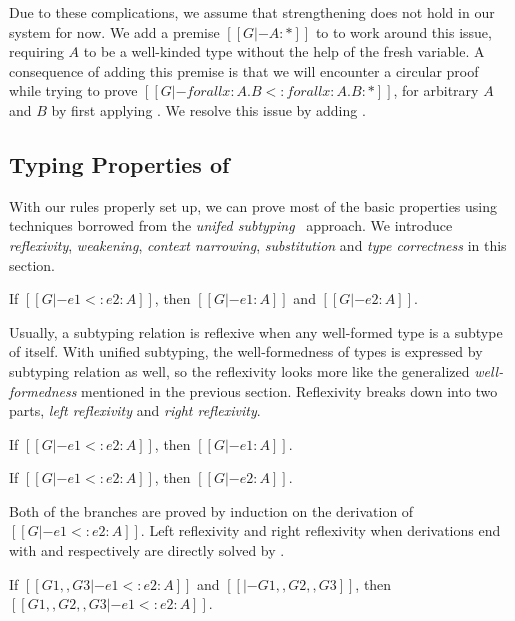 Due to these complications, we assume that strengthening does not hold in our system for now.
We add a premise $[[G |- A : *]]$ to  to work around this issue,
requiring $A$ to be a well-kinded type without the help of the fresh variable.
A consequence of adding this premise is that we will encounter a circular proof
while trying to prove $[[G |- forall x : A. B <: forall x : A . B : *]]$, for
arbitrary $A$ and $B$ by first applying . We resolve this issue by
adding .

\subsection{Typing Properties of \name}
\label{sec:typing-properties}

With our rules properly set up, we can prove most of the basic properties
using techniques borrowed from the \emph{unifed subtyping}~\citep{full} approach.
We introduce \emph{reflexivity}, \emph{weakening},
\emph{context narrowing}, \emph{substitution} and \emph{type correctness}
in this section.

\begin{theorem}[Reflexivity]
   If $[[G |- e1 <: e2 : A]]$,
   then $[[G |- e1 : A]]$ and $[[G |- e2 : A]]$.
\end{theorem}

Usually, a subtyping relation is reflexive when any well-formed type is a subtype
of itself. With unified subtyping, the well-formedness of types is expressed by
subtyping relation as well, so the reflexivity looks more like the generalized
\emph{well-formedness} mentioned in the previous section. Reflexivity
breaks down into two parts, \emph{left reflexivity} and \emph{right reflexivity}.

\begin{lemma}
   If $[[G |- e1 <: e2 : A]]$,
   then $[[G |- e1 : A]]$.
\end{lemma}

\begin{lemma}
   If $[[G |- e1 <: e2 : A]]$,
   then $[[G |- e2 : A]]$.
\end{lemma}

\noindent Both of the branches are proved by induction on the derivation of
$[[G |- e1 <: e2 : A]]$.
Left reflexivity and right reflexivity when derivations end with 
and  respectively are directly solved by .

\begin{theorem}[Weakening]
    If $[[G1 ,, G3 |- e1 <: e2 : A]]$ and $[[|- G1 ,, G2 ,, G3]]$,
    then $[[G1 ,, G2 ,, G3 |- e1 <: e2 : A]]$.
\end{theorem}

